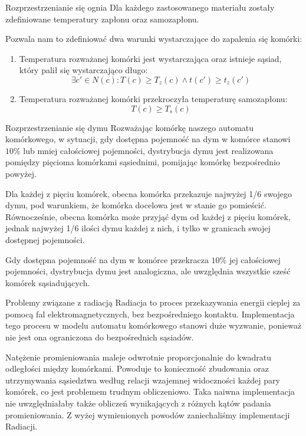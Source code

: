 \documentclass{beamer}
\begin{document}
\begin{frame}{Rozprzestrzenianie się ognia}
    Dla każdego zastosowanego materiału zostały zdefiniowane temperatury zapłonu oraz samozapłonu.
    \newline

    Pozwala nam to zdefiniować dwa warunki wystarczające do zapalenia się komórki:
    \begin{enumerate}
        \item Temperatura rozważanej komórki jest wystarczająca oraz istnieje sąsiad, który palił się wystarczająco długo:
        \begin{equation}
            \exists c' \in N(c): T(c) \geq T_z(c) \wedge t(c') \geq t_z(c')
        \end{equation}

        \item Temperatura rozważanej komórki przekroczyła temperaturę samozapłonu:
            \begin{equation}
                T(c) \geq T_s(c)
            \end{equation}
    \end{enumerate}
\end{frame}

\begin{frame}{Rozprzestrzenianie się dymu}
    Rozważając komórkę naszego automatu komórkowego, w sytuacji, gdy dostępna pojemność na dym w komórce stanowi \(10\%\) lub mniej całościowej pojemności, dystrybucja dymu jest realizowana pomiędzy pięcioma komórkami sąsiednimi, pomijając komórkę bezpośrednio powyżej.

    Dla każdej z pięciu komórek, obecna komórka przekazuje najwyżej 1/6 swojego dymu, pod warunkiem, że komórka docelowa jest w stanie go pomieścić. Równocześnie, obecna komórka może przyjąć dym od każdej z pięciu komórek, jednak najwyżej 1/6 ilości dymu każdej z nich, i tylko w granicach swojej dostępnej pojemności.

    Gdy dostępna pojemność na dym w komórce przekracza \(10\%\) jej całościowej pojemności, dystrybucja dymu jest analogiczna, ale uwzględnia wszystkie sześć komórek sąsiadujących.
\end{frame}

\begin{frame}{Problemy związane z radiacją}
    Radiacja to proces przekazywania energii cieplej za pomocą fal elektromagnetycznych, bez bezpośredniego kontaktu. Implementacja tego procesu w modelu automatu komórkowego stanowi duże wyzwanie, ponieważ nie jest ona ograniczona do bezpośrednich sąsiadów.
    \newline

    Natężenie promieniowania maleje odwrotnie proporcjonalnie do kwadratu odległości między komórkami.
    Powoduje to konieczność zbudowania oraz utrzymywania sąsiedztwa według relacji wzajemnej widoczności każdej pary komórek, co jest problemem trudnym obliczeniowo. Taka naiwna implementacja nie uwzględniałaby także obliczeń wynikających z różnych kątów padania promieniowania. Z wyżej wymienionych powodów zaniechaliśmy implementacji Radiacji.
\end{frame}
\end{document}
